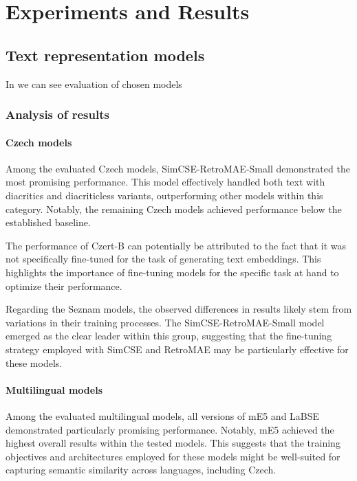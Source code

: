 
\chapter{Experiments and Results\label{chap:experiments_and_results}}

\section{Text representation models}
In  we can see evaluation of chosen models

\subsection{Analysis of results}
\subsubsection{Czech models}
Among the evaluated Czech models, SimCSE-RetroMAE-Small demonstrated the most promising performance.
This model effectively handled both text with diacritics and diacriticless variants, outperforming other models within this category.
Notably, the remaining Czech models achieved performance below the established baseline.

The performance of Czert-B can potentially be attributed to the fact that it was not specifically fine-tuned for the task of generating text embeddings.
This highlights the importance of fine-tuning models for the specific task at hand to optimize their performance.

Regarding the Seznam models, the observed differences in results likely stem from variations in their training processes.
The SimCSE-RetroMAE-Small model emerged as the clear leader within this group, suggesting that the fine-tuning strategy employed with \ac{SimCSE} and \ac{RetroMAE} may be particularly effective for these models.

\subsubsection{Multilingual models}
Among the evaluated multilingual models, all versions of mE5 and LaBSE demonstrated particularly promising performance.
Notably, mE5 achieved the highest overall results within the tested models.
This suggests that the training objectives and architectures employed for these models might be well-suited for capturing semantic similarity across languages, including Czech.

